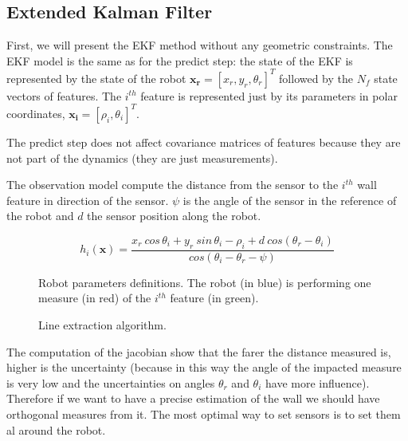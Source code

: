 \documentclass[a4paper,12pt]{article}
\begin{document}
\subsection{Extended Kalman Filter}
\label{sec:EKF}

First, we will present the EKF method without any geometric constraints.
The EKF model is the same as \cite{zunino2001simultaneous} for the predict step: the state of the EKF is represented by the state of the robot $\mathbf{x_r} = \left [x_r,y_r,\theta_r \right ]^T$ followed by the $N_f$ state vectors of features.
The $i^{th}$ feature is represented just by its parameters in polar coordinates, $\mathbf{x_i} = [\rho_i, \theta_i]^T$.

The predict step does not affect covariance matrices of features because they are not part of the dynamics (they are just measurements).

The observation model compute the distance from the sensor to the $i^{th}$ wall feature in direction of the sensor. $\psi$ is the angle of the sensor in the reference of the robot and $d$ the sensor position along the robot.

\begin{equation}
h_i(\mathbf{x}) =\frac{ x_r \: cos \, \theta_i + y_r \: sin \, \theta_i - \rho_i + d\: cos(\theta_r-\theta_i)}{cos(\theta_i-\theta_r-\psi)} 
\end{equation}

\begin{figure}[ht]
\centering
\begin{minipage}[b]{0.45\linewidth}

\centering
	
  	\caption{Robot parameters definitions. The robot (in blue) is performing one measure (in red) of the $i^{th}$ feature (in green).}
  	\label{fig:minipage1}
\end{minipage}
\quad
\begin{minipage}[b]{0.45\linewidth}
\centering
	
  	\caption{Line extraction algorithm.}
\label{fig:minipage2}
\end{minipage}
\end{figure}
The computation of the jacobian show that the farer the distance measured is, higher is the uncertainty (because in this way the angle of the impacted measure is very low and the uncertainties on angles $\theta_r$ and $\theta_i$ have more influence).
Therefore if we want to have a precise estimation of the wall we should have orthogonal measures from it. The most optimal way to set sensors is to set them al around the robot.
\end{document}
